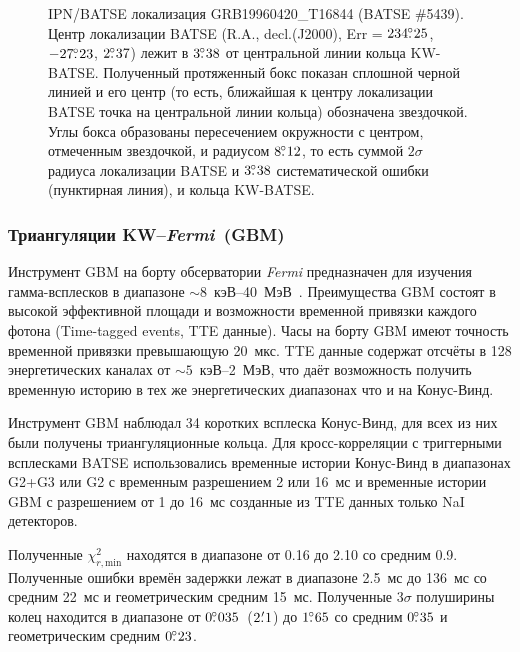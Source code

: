 \begin{figure}[h]
    \caption[IPN/BATSE локализация GRB19960420\_T16844 (BATSE \#5439)]
    {IPN/BATSE локализация GRB19960420\_T16844 (BATSE \#5439). 
    Центр локализации BATSE 
    (R.A., decl.(J2000), Err = $ 234\mbox{$.\!\!^\circ$}25$, $-27\mbox{$.\!\!^\circ$}23$, $2\mbox{$.\!\!^\circ$}37$)
    лежит в $3\mbox{$.\!\!^\circ$}38$ от центральной линии кольца KW-BATSE.
    Полученный протяженный бокс показан сплошной черной линией и его центр 
    (то есть, ближайшая к центру локализации BATSE точка на центральной линии кольца) обозначена звездочкой. 
    Углы бокса образованы пересечением окружности с центром, отмеченным звездочкой, и
    радиусом $8\mbox{$.\!\!^\circ$}12$, то есть суммой $2\sigma$ радиуса локализации BATSE
    и $3\mbox{$.\!\!^\circ$}38$ систематической ошибки (пунктирная линия), и кольца KW-BATSE.
    }
 \label{img:IPN_BATSE_loc}  
\end{figure}
\FloatBarrier
\subsubsection{Триангуляции KW--\textit{Fermi}~(GBM)}
Инструмент GBM на борту обсерватории \textit{Fermi} предназначен для изучения 
гамма-всплесков в диапазоне $\sim8$~кэВ--40~МэВ~\citep{Meegan_2009ApJ}. 
Преимущества GBM состоят в высокой эффективной площади и возможности временной 
привязки каждого фотона (Time-tagged events, TTE данные). Часы на борту GBM имеют 
точность временной привязки превышающую 20~мкс. TTE данные содержат отсчёты в 128 
энергетических каналах от $\sim5$~кэВ--2~МэВ, что даёт возможность получить 
временную историю в тех же энергетических диапазонах что и на Конус-Винд.

Инструмент GBM наблюдал 34 коротких всплеска Конус-Винд, для всех из них были 
получены триангуляционные кольца. Для кросс-корреляции с триггерными всплесками 
BATSE использовались временные истории Конус-Винд в диапазонах G2+G3 или G2 с 
временным разрешением 2 или 16~мс и временные истории GBM с разрешением от 1 до 
16~мс созданные из TTE данных только NaI детекторов.

Полученные $\chi^2_{r,\textrm{min}}$ находятся в диапазоне от 0.16 до 2.10 со средним 0.9. 
Полученные ошибки времён задержки лежат в диапазоне 2.5~мс до 136~мс со средним 22~мс и 
геометрическим средним 15~мс. Полученные $3\sigma$ полуширины  колец находится в 
диапазоне от $0\mbox{$.\!\!^\circ$}035$~($2\mbox{$.\mkern-4mu^\prime$}1$) до $1\mbox{$.\!\!^\circ$}65$ 
со средним $0\mbox{$.\!\!^\circ$}35$ и геометрическим средним $0\mbox{$.\!\!^\circ$}23$.

